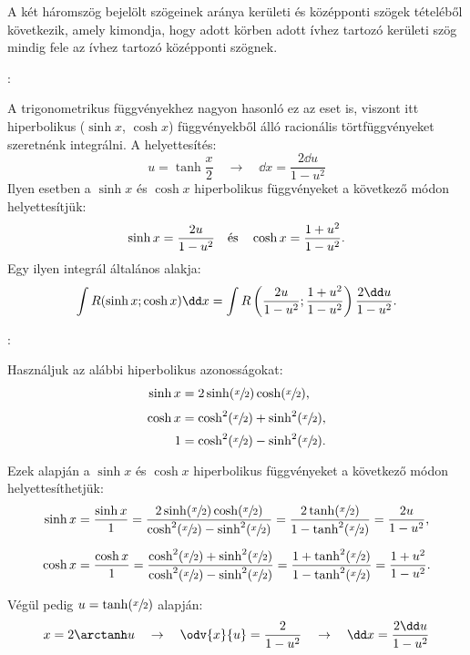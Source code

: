 \documentclass[a4paper, 12pt]{scrartcl}
\begin{document}
\begin{note}
  A két háromszög bejelölt szögeinek aránya kerületi és
  középponti szögek tételéből következik, amely kimondja, hogy adott körben
  adott ívhez tartozó kerületi szög mindig fele az ívhez tartozó középponti
  szögnek.
\end{note}


\begin{blueBox}
  :

  A trigonometrikus függvényekhez nagyon hasonló ez az eset is, viszont itt
  hiperbolikus ($\sinh x$, $\cosh x$) függvényekből álló racionális
  törtfüggvényeket szeretnénk integrálni. A helyettesítés:
  \[
    u = \tanh \frac{x}{2}
    \quad \rightarrow \quad
    \dd x = \frac{2 \dd u}{1 - u^2}
  \]
  Ilyen esetben a $\sinh x$ és $\cosh x$ hiperbolikus függvényeket a következő
  módon helyettesítjük:
  \[
    \sinh x = \frac{2u}{1 - u^2}
    \quad \text{és} \quad
    \cosh x = \frac{1 + u^2}{1 - u^2}
    \text.
  \]
  Egy ilyen integrál általános alakja:
  \[
    \int R(\sinh x; \cosh x) \dd x =
    \int R\left(
    \frac{2u}{1 - u^2}; \frac{1 + u^2}{1 - u^2}
    \right) \frac{2 \dd u}{1 - u^2}
    \text.
  \]
\end{blueBox}

\begin{note}
  :

  Használjuk az alábbi hiperbolikus azonosságokat:
  \begin{align*}
    \sinh x & = 2 \sinh (\sfrac{x}{2}) \cosh (\sfrac{x}{2}) \text,     \\[1mm]
    \cosh x & = \cosh^2 (\sfrac{x}{2}) + \sinh^2 (\sfrac{x}{2}) \text, \\[1mm]
    1       & = \cosh^2 (\sfrac{x}{2}) - \sinh^2 (\sfrac{x}{2}) \text.
  \end{align*}

  Ezek alapján a $\sinh x$ és $\cosh x$ hiperbolikus függvényeket a következő
  módon helyettesíthetjük:
  \begin{align*}
    \sinh x & = \frac{\sinh x}{1} = \frac{
      2 \sinh (\sfrac{x}{2}) \cosh (\sfrac{x}{2})
    }{
      \cosh^2 (\sfrac{x}{2}) - \sinh^2 (\sfrac{x}{2})
    } = \frac{
      2 \tanh (\sfrac{x}{2})
    }{
      1 - \tanh^2 (\sfrac{x}{2})
    } = \frac{
      2u
    }{
      1 - u^2
    }
    \text,
    \\[2mm]
    \cosh x & = \frac{\cosh x}{1}= \frac{
      \cosh^2 (\sfrac{x}{2}) + \sinh^2 (\sfrac{x}{2})
    }{
      \cosh^2 (\sfrac{x}{2}) - \sinh^2 (\sfrac{x}{2})
    } = \frac{
      1 + \tanh^2 (\sfrac{x}{2})
    }{
      1 - \tanh^2 (\sfrac{x}{2})
    } = \frac{
      1 + u^2
    }{
      1 - u^2
    }
    \text.
  \end{align*}

  Végül pedig $u = \tanh (\sfrac{x}{2})$ alapján:
  \[
    x = 2 \arctanh u
    \quad \rightarrow \quad
    \odv{x}{u} = \frac{2}{1 - u^2}
    \quad \rightarrow \quad
    \dd x = \frac{2 \dd u}{1 - u^2}
  \]
\end{note}
\end{document}
